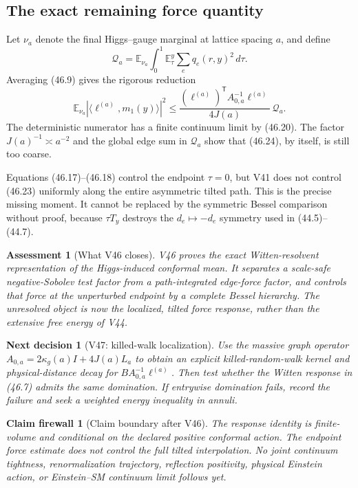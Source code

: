 \documentclass[11pt]{article}
\newtheorem{firewall}[theorem]{Claim firewall}
\newtheorem{decision}[theorem]{Next decision}
\newtheorem{assessment}[theorem]{Assessment}
\theoremstyle{remark}
\begin{document}
\subsection{The exact remaining force quantity}

Let \(\nu_a\) denote the final Higgs--gauge marginal at lattice spacing
\(a\), and define
\[
 \mathcal Q_a
 =
 \mathbb E_{\nu_a}
 \int_0^1\mathbb E_\tau^y
 \sum_e q_e(r,y)^2\,d\tau.                        \tag{46.23}
\]
Averaging (46.9) gives the rigorous reduction
\[
 \mathbb E_{\nu_a}
 |\langle\ell^{(a)},m_1(y)\rangle|^2
 \leq
 \frac{
 (\ell^{(a)})^{\mathsf T}A_{0,a}^{-1}\ell^{(a)}
 }{4J(a)}\,\mathcal Q_a.                          \tag{46.24}
\]
The deterministic numerator has a finite continuum limit by (46.20).
The factor \(J(a)^{-1}\asymp a^{-2}\) and the global edge sum in
\(\mathcal Q_a\) show that (46.24), by itself, is still too coarse.

Equations (46.17)--(46.18) control the endpoint \(\tau=0\), but V41
does not control (46.23) uniformly along the entire asymmetric tilted
path.  This is the precise missing moment.  It cannot be replaced by
the symmetric Bessel comparison without proof, because
\(\tau T_y\) destroys the \(d_e\mapsto-d_e\) symmetry used in
(44.5)--(44.7).

\begin{assessment}[What V46 closes]
\label{ass:v17v46-status}
V46 proves the exact Witten-resolvent representation of the
Higgs-induced conformal mean.  It separates a scale-safe
negative-Sobolev test factor from a path-integrated edge-force factor,
and controls that force at the unperturbed endpoint by a complete
Bessel hierarchy.  The unresolved object is now the localized,
tilted force response, rather than the extensive free energy of V44.
\end{assessment}

\begin{decision}[V47: killed-walk localization]
\label{dec:v17v46-next}
Use the massive graph operator
\(A_{0,a}=2\kappa_g(a)I+4J(a)L_a\) to obtain an explicit
killed-random-walk kernel and physical-distance decay for
\(B A_{0,a}^{-1}\ell^{(a)}\).  Then test whether the Witten response
in (46.7) admits the same domination.  If entrywise domination fails,
record the failure and seek a weighted energy inequality in annuli.
\end{decision}

\begin{firewall}[Claim boundary after V46]
\label{fire:v17v46}
The response identity is finite-volume and conditional on the declared
positive conformal action.  The endpoint force estimate does not
control the full tilted interpolation.  No joint continuum tightness,
renormalization trajectory, reflection positivity, physical Einstein
action, or Einstein--SM continuum limit follows yet.
\end{firewall}
\end{document}
